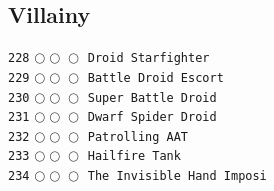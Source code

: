 \documentclass[a4paper,landscape]{article}
\begin{document}
\begin{multicols*}{5}
\section{Villainy} 
\vspace{-2mm} 
\texttt{228} \(\bigcirc\!\bigcirc\!\bigcirc\)  \texttt{Droid Starfighter} \vspace{-0.3mm}\\ 
\texttt{229} \(\bigcirc\!\bigcirc\!\bigcirc\)  \texttt{Battle Droid Escort} \vspace{-0.3mm}\\ 
\texttt{230} \(\bigcirc\!\bigcirc\!\bigcirc\)  \texttt{Super Battle Droid} \vspace{-0.3mm}\\ 
\texttt{231} \(\bigcirc\!\bigcirc\!\bigcirc\)  \texttt{Dwarf Spider Droid} \vspace{-0.3mm}\\ 
\texttt{232} \(\bigcirc\!\bigcirc\!\bigcirc\)  \texttt{Patrolling AAT} \vspace{-0.3mm}\\ 
\texttt{233} \(\bigcirc\!\bigcirc\!\bigcirc\)  \texttt{Hailfire Tank} \vspace{-0.3mm}\\ 
\texttt{234} \(\bigcirc\!\bigcirc\!\bigcirc\)  \texttt{The Invisible Hand Imposi} \vspace{-0.3mm}\\ 

\end{multicols*}
\end{document}
